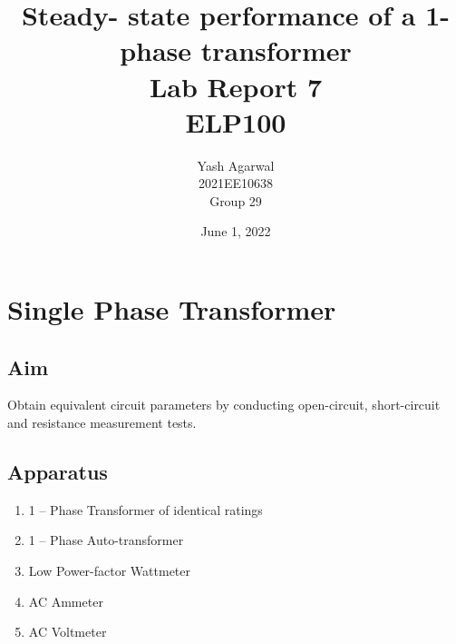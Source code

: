 \documentclass{article}
\title{Steady- state performance of a 1-phase transformer \\ Lab Report 7 \\ ELP100}
\author{Yash Agarwal \\ 2021EE10638 \\ Group 29}
\date{June 1, 2022}
\begin{document}
\pagecolor{yellow!15}
\maketitle
\vspace{15px}
\tableofcontents
{}
\newpage
\section{Single Phase Transformer}
\subsection{Aim}
Obtain equivalent circuit parameters by conducting open-circuit, short-circuit and resistance measurement tests.
\subsection{Apparatus}
\begin{enumerate}
\item 1 – Phase Transformer of identical ratings
\item 1 – Phase Auto-transformer
\item Low Power-factor Wattmeter
\item AC Ammeter
\item AC Voltmeter

\end{enumerate}
\end{document}
